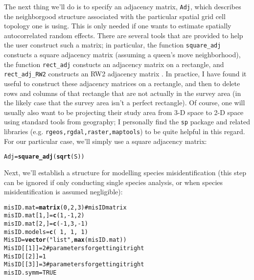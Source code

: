 \documentclass{article}\usepackage{graphicx, color}
\makeatletter
\newcommand{\hlfunctioncall}[1]{\textcolor[rgb]{0.501960784313725,0,0.329411764705882}{\textbf{#1}}}%
\newcommand{\hlstring}[1]{\textcolor[rgb]{0.6,0.6,1}{#1}}%
\newcommand{\hlcomment}[1]{\textcolor[rgb]{0.180392156862745,0.6,0.341176470588235}{#1}}%
\newenvironment{kframe}{%
 \def\at@end@of@kframe{}%
 \ifinner\ifhmode%
  \def\at@end@of@kframe{\end{minipage}}%
  \begin{minipage}{\columnwidth}%
 \fi\fi%
 \def\FrameCommand##1{\hskip\@totalleftmargin \hskip-\fboxsep
 \colorbox{shadecolor}{##1}\hskip-\fboxsep
     \hskip-\linewidth \hskip-\@totalleftmargin \hskip\columnwidth}%
 \MakeFramed {\advance\hsize-\width
   \@totalleftmargin\z@ \linewidth\hsize
   \@setminipage}}%
 {\par\unskip\endMakeFramed%
 \at@end@of@kframe}
\newenvironment{knitrout}{}{} %
\makeatother
\begin{document}
The next thing we'll do is to specify an adjacency matrix, \texttt{Adj}, which describes the neighborgood structure associated with the particular spatial grid cell topology one is using.  This is only needed if one wants to estimate spatially autocorrelated random effects.  There are several tools that are provided to 
help the user construct such a matrix; in particular, the function \texttt{square\_adj} constucts a square adjacency matrix (assuming a queen's move neighborhood), the function \texttt{rect\_adj} constucts an adjacency matrix on a rectangle, and \texttt{rect\_adj\_RW2} constructs an RW2 adjacency matrix \citep[which provides a greater degree of smoothing; see][]{RueHeld2004}.  In practice, I have found it useful to construct these adjacency matrices on a rectangle, and then to delete rows and columns of that rectangle that are not actually in the survey area (in the likely case that the survey area isn't a perfect rectangle).  Of course, one will usually also want to be projecting their study area from 3-D space to 2-D space using standard tools from geography; I personally find the \texttt{sp} package and related libraries (e.g. \texttt{rgeos,rgdal,raster,maptools}) to be quite helpful in this regard.  For our particular case, we'll simply use a square adjacency matrix:

\begin{knitrout}
\color{fgcolor}\begin{kframe}
\begin{alltt}
Adj = \hlfunctioncall{square_adj}(\hlfunctioncall{sqrt}(S))
\end{alltt}
\end{kframe}
\end{knitrout}


Next, we'll establish a structure for modelling species misidentification (this step
can be ignored if only conducting single species analysis, or when species misidentification is assumed negligible):

\begin{knitrout}
\color{fgcolor}\begin{kframe}
\begin{alltt}
misID.mat = \hlfunctioncall{matrix}(0, 2, 3)  \hlcomment{# misID matrix}
misID.mat[1, ] = \hlfunctioncall{c}(1, -1, 2)
misID.mat[2, ] = \hlfunctioncall{c}(-1, 3, -1)
misID.models = \hlfunctioncall{c}(~1, ~1, ~1)
MisID = \hlfunctioncall{vector}(\hlstring{"list"}, \hlfunctioncall{max}(misID.mat))
MisID[[1]] = 2  \hlcomment{#parameters for getting it right}
MisID[[2]] = 1
MisID[[3]] = 3  \hlcomment{#parameters for getting it right}
misID.symm = TRUE
\end{alltt}
\end{kframe}
\end{knitrout}
\end{document}
